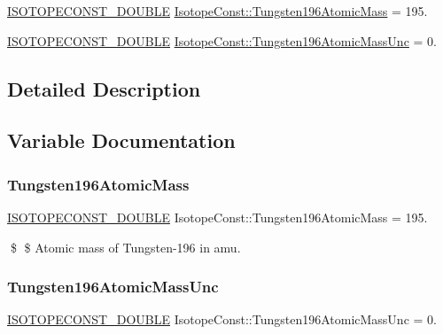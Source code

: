 \begin{DoxyCompactItemize}
\item 
\mbox{\hyperlink{group___isotope_const-_macros_ga8f45a7272ce02c0b4c65c44636ed719a}{I\+S\+O\+T\+O\+P\+E\+C\+O\+N\+S\+T\+\_\+\+D\+O\+U\+B\+LE}} \mbox{\hyperlink{group___isotope_const-_tungsten-_w196_ga4d2671f4d4bf32406042f273c8d9f6d3}{Isotope\+Const\+::\+Tungsten196\+Atomic\+Mass}} = 195.
\item 
\mbox{\hyperlink{group___isotope_const-_macros_ga8f45a7272ce02c0b4c65c44636ed719a}{I\+S\+O\+T\+O\+P\+E\+C\+O\+N\+S\+T\+\_\+\+D\+O\+U\+B\+LE}} \mbox{\hyperlink{group___isotope_const-_tungsten-_w196_gaae04b6bdf2b01165a4f95900b3c2589f}{Isotope\+Const\+::\+Tungsten196\+Atomic\+Mass\+Unc}} = 0.
\end{DoxyCompactItemize}


\subsection{Detailed Description}


\subsection{Variable Documentation}
\mbox{\label{group___isotope_const-_tungsten-_w196_ga4d2671f4d4bf32406042f273c8d9f6d3}} 
\subsubsection{\texorpdfstring{Tungsten196\+Atomic\+Mass}{Tungsten196AtomicMass}}
{\footnotesize\ttfamily \mbox{\hyperlink{group___isotope_const-_macros_ga8f45a7272ce02c0b4c65c44636ed719a}{I\+S\+O\+T\+O\+P\+E\+C\+O\+N\+S\+T\+\_\+\+D\+O\+U\+B\+LE}} Isotope\+Const\+::\+Tungsten196\+Atomic\+Mass = 195.}

\$ \$ Atomic mass of Tungsten-\/196 in amu. \mbox{\label{group___isotope_const-_tungsten-_w196_gaae04b6bdf2b01165a4f95900b3c2589f}} 
\subsubsection{\texorpdfstring{Tungsten196\+Atomic\+Mass\+Unc}{Tungsten196AtomicMassUnc}}
{\footnotesize\ttfamily \mbox{\hyperlink{group___isotope_const-_macros_ga8f45a7272ce02c0b4c65c44636ed719a}{I\+S\+O\+T\+O\+P\+E\+C\+O\+N\+S\+T\+\_\+\+D\+O\+U\+B\+LE}} Isotope\+Const\+::\+Tungsten196\+Atomic\+Mass\+Unc = 0.}

